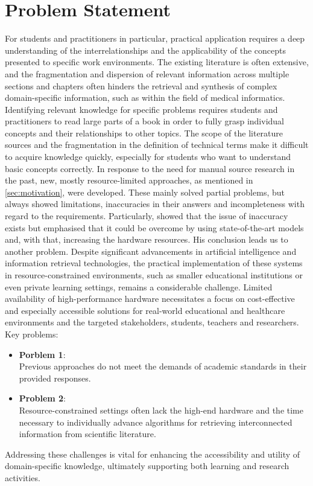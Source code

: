 \section{Problem Statement}\label{sec:problem statement}
For students and practitioners in particular, practical application requires a deep understanding of the interrelationships and the applicability of the concepts presented to specific work environments.
The existing literature is often extensive, and the fragmentation and dispersion of relevant information across multiple sections and chapters often hinders the retrieval and synthesis of complex domain-specific information, such as within the field of medical informatics.
Identifying relevant knowledge for specific problems requires students and practitioners to read large parts of a book in order to fully grasp individual concepts and their relationships to other topics.
The scope of the literature sources and the fragmentation in the definition of technical terms make it difficult to acquire knowledge quickly, especially for students who want to understand basic concepts correctly.
%
In response to the need for manual source research in the past, new, mostly resource-limited approaches, as mentioned in \cref{sec:motivation}, were developed. 
These mainly solved partial problems, but always showed limitations, inaccuracies in their answers and incompleteness with regard to the requirements. 
%
Particularly, \citet{Paul_Keller} showed that the issue of inaccuracy exists but emphasised that it could be overcome by using state-of-the-art models and, with that, increasing the hardware resources. 
His conclusion leads us to another problem.   
Despite significant advancements in artificial intelligence and information retrieval technologies, the practical implementation of these systems in resource-constrained environments, such as smaller educational institutions or even private learning settings, remains a considerable challenge. 
Limited availability of high-performance hardware necessitates a focus on cost-effective and especially accessible solutions for real-world educational and healthcare environments and the targeted stakeholders, students, teachers and researchers.
%
Key problems:
\begin{itemize}
    \item \textbf{Porblem 1}:\\
    Previous approaches do not meet the demands of academic standards in their provided responses. 
    \item \textbf{Problem 2}:\\ 
    Resource-constrained settings often lack the high-end hardware and the time necessary to individually advance algorithms for retrieving interconnected information from scientific literature.
\end{itemize}
%
Addressing these challenges is vital for enhancing the accessibility and utility of domain-specific knowledge, ultimately supporting both learning and research activities. 

